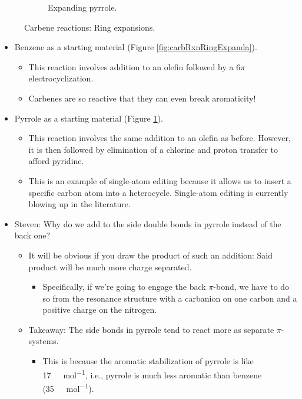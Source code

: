 \documentclass[../notes.tex]{subfiles}
\begin{document}
\begin{itemize}
\begin{figure}[h!]
\begin{subfigure}[b]{\linewidth}
            \caption{Expanding pyrrole.}
            \label{fig:carbRxnRingExpandb}
        \end{subfigure}
        \caption{Carbene reactions: Ring expansions.}
        \label{fig:carbRxnRingExpand}
    \end{figure}
    \begin{itemize}
        \item Benzene as a starting material (Figure \ref{fig:carbRxnRingExpanda}).
        \begin{itemize}
            \item This reaction involves addition to an olefin followed by a $6\pi$ electrocyclization.
            \item Carbenes are so reactive that they can even break aromaticity!
        \end{itemize}
        \item Pyrrole as a starting material (Figure \ref{fig:carbRxnRingExpandb}).
        \begin{itemize}
            \item This reaction involves the same addition to an olefin as before. However, it is then followed by elimination of a chlorine and proton transfer to afford pyridine.
            \item This is an example of single-atom editing because it allows us to insert a specific carbon atom into a heterocycle. Single-atom editing is currently blowing up in the literature.
        \end{itemize}
        \item Steven: Why do we add to the side double bonds in pyrrole instead of the back one?
        \begin{itemize}
            \item It will be obvious if you draw the product of such an addition: Said product will be much more charge separated.
            \begin{itemize}
                \item Specifically, if we're going to engage the back $\pi$-bond, we have to do so from the resonance structure with a carbanion on one carbon and a positive charge on the nitrogen.
            \end{itemize}
            \item Takeaway: The side bonds in pyrrole tend to react more as separate $\pi$-systems.
            \begin{itemize}
                \item This is because the aromatic stabilization of pyrrole is like \SI[per-mode=symbol]{17}{\kilo\calorie\per\mole}, i.e., pyrrole is much less aromatic than benzene (\SI[per-mode=symbol]{35}{\kilo\calorie\per\mole}).

\end{itemize}
\end{itemize}
\end{itemize}
\end{itemize}
\end{document}
